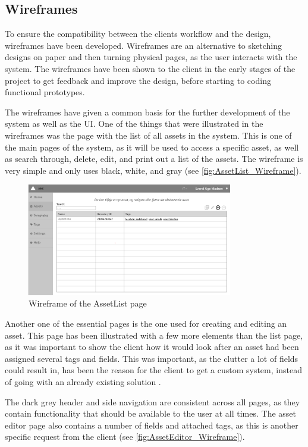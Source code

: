 \subsection{Wireframes}
To ensure the compatibility between the clients workflow and the design, wireframes have been developed. Wireframes are an alternative to sketching designs on paper and then turning physical pages, as the user interacts with the system. The wireframes have been shown to the client in the early stages of the project to get feedback and improve the design, before starting to coding functional prototypes.
\par
The wireframes have given a common basis for the further development of the system as well as the UI. One of the things that were illustrated in the wireframes was the page with the list of all assets in the system. This is one of the main pages of the system, as it will be used to access a specific asset, as well as search through, delete, edit, and print out a list of the assets. The wireframe is very simple and only uses black, white, and gray (see \autoref{fig:AssetList_Wireframe}).

\begin{figure}[H]
    \centering
    \includegraphics[width=0.8\textwidth]{figures/wireframes/AssetList_Wireframe.png}
    \caption{Wireframe of the AssetList page}
    \label{fig:AssetList_Wireframe}
\end{figure}

Another one of the essential pages is the one used for creating and editing an asset. This page has been illustrated with a few more elements than the list page, as it was important to show the client how it would look after an asset had been assigned several tags and fields. This was important, as the clutter a lot of fields could result in, has been the reason for the client to get a custom system, instead of going with an already existing solution . 
\par
The dark grey header and side navigation are consistent across all pages, as they contain functionality that should be available to the user at all times. The asset editor page also contains a number of fields and attached tags, as this is another specific request from the client (see \autoref{fig:AssetEditor_Wireframe}).

